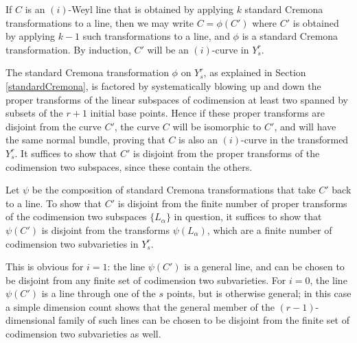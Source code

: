 \documentclass[12pt]{article}
\numberwithin{equation}{section}
\numberwithin{subeq}{equation}
\def\calO{\mathcal{O}}
\begin{document}
If $C$ is an $(i)$-Weyl line that is obtained by applying $k$ standard Cremona transformations to a line, then we may write $C = \phi(C')$ where $C'$ is obtained by applying $k-1$ such transformations to a line, and $\phi$ is a standard Cremona transformation. By induction, $C'$ will be an $(i)$-curve in $Y^r_s$.

The standard Cremona transformation $\phi$ on $Y^r_s$,
as explained in Section \ref{standardCremona},
is factored by systematically blowing up and down the proper transforms of the linear subspaces of codimension at least two spanned by subsets of the $r+1$ initial base points.  Hence if these proper transforms are disjoint from the curve $C'$, the curve $C$ will be isomorphic to $C'$, and will have the same normal bundle, proving that $C$ is also an $(i)$-curve in the transformed $Y^r_s$.  It suffices to show that $C'$ is disjoint from the proper transforms of the codimension two subspaces, since these contain the others.

Let $\psi$ be the composition of standard Cremona transformations 
that take $C'$ back to a line.  
To show that $C'$ is disjoint from 
the finite number of proper transforms 
of the codimension two subspaces $\{L_\alpha\}$ in question, 
it suffices to show that $\psi(C')$ is disjoint from the transforms $\psi(L_\alpha)$,
which are a finite number of codimension two subvarieties in $Y^r_s$.

This is obvious for $i=1$: the line $\psi(C')$ is a general line, and can be chosen to be disjoint from any finite set of codimension two subvarieties.
For $i=0$, the line $\psi(C')$ is a line through one of the $s$ points, but is otherwise general;
in this case a simple dimension count shows that the general member of the $(r-1)$-dimensional family of such lines can be chosen to be disjoint from the finite set of codimension two subvarieties as well.


\end{document}
